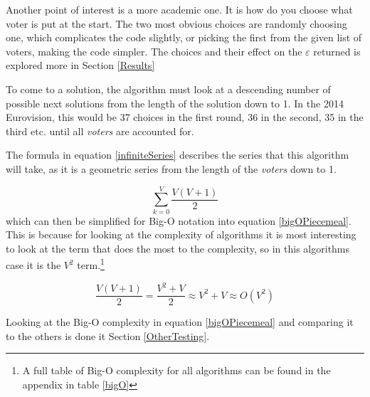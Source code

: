 \documentclass[12pt]{report}
\begin{document}
Another point of interest is a more academic one. It is how do you choose what voter is put at the start. The two most obvious choices are randomly choosing one, which complicates the code slightly, or picking the first from the given list of voters, making the code simpler. The choices and their effect on the $\varepsilon$ returned is explored more in Section \ref{Results}

To come to a solution, the algorithm must look at a descending number of possible next solutions from the length of the solution down to 1. In the 2014 Eurovision, this would be 37 choices in the first round, 36 in the second, 35 in the third etc. until all \textit{voters} are accounted for.

The formula in equation \ref{infiniteSeries} describes the series that this algorithm will take, as it is a geometric series from the length of the \textit{voters} down to 1.

\begin{equation}\label{infiniteSeries}
	\sum_{k=0}^{V} \frac{V(V+1)}{2}
\end{equation}
which can then be simplified for Big-O notation into equation \ref{bigOPiecemeal}. This is because for looking at the complexity of algorithms it is most interesting to look at the term that does the most to the complexity, so in this algorithms case it is the $V^2$ term.\footnote{A full table of Big-O complexity for all algorithms can be found in the appendix in table \ref{bigO}}

\begin{equation}\label{bigOPiecemeal}
	\frac{V(V+1)}{2} = \frac{V^2 + V}{2} \approx V^2 + V \approx O(V^2)
\end{equation}

Looking at the Big-O complexity in equation \ref{bigOPiecemeal} and comparing it to the others is done it Section \ref{OtherTesting}.

\clearpage
\end{document}
